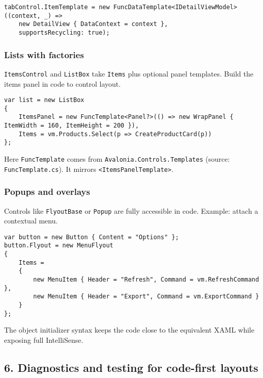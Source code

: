 \begin{lstlisting}
tabControl.ItemTemplate = new FuncDataTemplate<IDetailViewModel>((context, _) =>
    new DetailView { DataContext = context },
    supportsRecycling: true);
\end{lstlisting}

\subsubsection{Lists with factories}\label{lists-with-factories}

\passthrough{\lstinline!ItemsControl!} and
\passthrough{\lstinline!ListBox!} take \passthrough{\lstinline!Items!}
plus optional panel templates. Build the items panel in code to control
layout.

\begin{lstlisting}
var list = new ListBox
{
    ItemsPanel = new FuncTemplate<Panel?>(() => new WrapPanel { ItemWidth = 160, ItemHeight = 200 }),
    Items = vm.Products.Select(p => CreateProductCard(p))
};
\end{lstlisting}

Here \passthrough{\lstinline!FuncTemplate!} comes from
\passthrough{\lstinline!Avalonia.Controls.Templates!} (source:
\passthrough{\lstinline!FuncTemplate.cs!}). It mirrors
\passthrough{\lstinline!<ItemsPanelTemplate>!}.

\subsubsection{Popups and overlays}\label{popups-and-overlays}

Controls like \passthrough{\lstinline!FlyoutBase!} or
\passthrough{\lstinline!Popup!} are fully accessible in code. Example:
attach a contextual menu.

\begin{lstlisting}
var button = new Button { Content = "Options" };
button.Flyout = new MenuFlyout
{
    Items =
    {
        new MenuItem { Header = "Refresh", Command = vm.RefreshCommand },
        new MenuItem { Header = "Export", Command = vm.ExportCommand }
    }
};
\end{lstlisting}

The object initializer syntax keeps the code close to the equivalent
XAML while exposing full IntelliSense.

\subsection{6. Diagnostics and testing for code-first
layouts}\label{diagnostics-and-testing-for-code-first-layouts}

